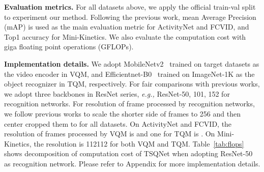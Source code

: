 \documentclass[runningheads]{llncs}
\newcommand{\tabref}[1]{Table~\ref{#1}}
\begin{document}
\noindent \textbf{Evaluation metrics.}
For all datasets above, we apply the official train-val split to experiment our method.
Following the previous work, mean Average Precision (mAP) is used as the main evaluation metric for ActivityNet and FCVID, and Top1 accuracy for Mini-Kinetics. We also evaluate the computation cost with giga floating point operations (GFLOPs). 


\noindent \textbf{Implementation details.}
We adopt MobileNetv2~\cite{mobilenetv2} trained on target datasets as the video encoder in VQM, and Efficientnet-B0~\cite{efficientnet} trained on ImageNet-1K as the object recognizer in TQM, respectively. 
For fair comparisons with previous works, we adopt three backbones in ResNet \cite{resnet} series,  \emph{e.g.,} ResNet-50, 101, 152 for recognition networks. 
For resolution of frame processed by recognition networks, we follow previous works to scale the shorter side of frames to 256 and then center cropped them to  for all datasets. On ActivityNet and FCVID, the resolution of frames processed by VQM is  and one for TQM is  \footnotemark[1].
On Mini-Kinetics, the resolution is 112112 for both VQM and TQM.
\tabref{tab:flops} shows decomposition of computation cost of TSQNet when adopting ResNet-50 as recognition network. Please refer to Appendix for more implementation details.



\begin{comment}
We uniformly pre-sample  frames from a video, and for those videos whose lengths are shorter than , we repeat multiple times to padding it to  frames.
Our frame sampler will select top  most salient frames in , 
 and  can be adjusted to accommodate different budgets for downstream applications. 
We use SGD optimizer with momentum of 0.9 and train model with batch size of 64 for 100 epochs. The learning rate is  , decayed by the factor of 0.1 at the 25, 50, 75 epoch. Loss ratio  and  are both 0.6. Fusion proportion  and  are 0.6 and 0.4, respectively.
\end{comment}
\end{document}
